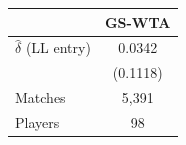 \begin{tabular}{lc}
\toprule
 & GS-WTA \\
\midrule
$\hat{\delta}$ (LL entry) & 0.0342 \\
 & (0.1118) \\
\midrule
Matches & 5,391 \\
Players & 98 \\
\bottomrule
\end{tabular}
